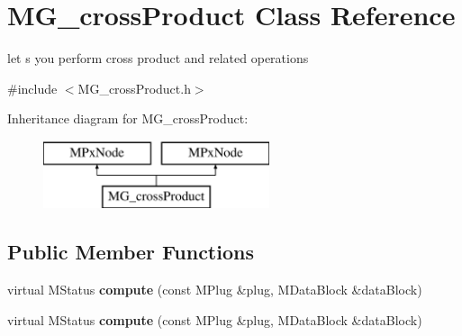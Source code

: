 \hypertarget{class_m_g__cross_product}{\section{M\-G\-\_\-cross\-Product Class Reference}
\label{class_m_g__cross_product}
}


let s you perform cross product and related operations  




{\ttfamily \#include $<$M\-G\-\_\-cross\-Product.\-h$>$}

Inheritance diagram for M\-G\-\_\-cross\-Product\-:\begin{figure}[H]
\begin{center}
\leavevmode
\includegraphics[height=2.000000cm]{class_m_g__cross_product}
\end{center}
\end{figure}
\subsection*{Public Member Functions}
\begin{DoxyCompactItemize}
\item 
\hypertarget{class_m_g__cross_product_a278dcb85153730af7f36eb05f887e230}{virtual M\-Status {\bfseries compute} (const M\-Plug \&plug, M\-Data\-Block \&data\-Block)}\label{class_m_g__cross_product_a278dcb85153730af7f36eb05f887e230}

\item 
\hypertarget{class_m_g__cross_product_a278dcb85153730af7f36eb05f887e230}{virtual M\-Status {\bfseries compute} (const M\-Plug \&plug, M\-Data\-Block \&data\-Block)}\label{class_m_g__cross_product_a278dcb85153730af7f36eb05f887e230}

\end{DoxyCompactItemize}

